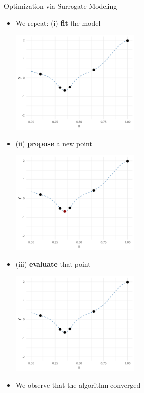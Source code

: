 \documentclass[11pt,compress,t,notes=noshow, xcolor=table]{beamer}
\begin{document}
\begin{vbframe}{Optimization via Surrogate Modeling}
\begin{itemize}
\framebreak

\item We repeat: (i) \textbf{fit} the model
\vspace{+.45cm}

\begin{center}
  \includegraphics[width = 0.5\textwidth]{figure_man/loop_7.png}
\end{center}

\framebreak

\item (ii) \textbf{propose} a new point
\vspace{+.45cm}

\begin{center}
  \includegraphics[width = 0.5\textwidth]{figure_man/loop_8.png}
\end{center}

\framebreak

\item (iii) \textbf{evaluate} that point
\vspace{+.45cm}

\begin{center}
  \includegraphics[width = 0.5\textwidth]{figure_man/loop_9.png}
\end{center}

\item We observe that the algorithm converged

\end{itemize}

\end{vbframe}
\end{document}
